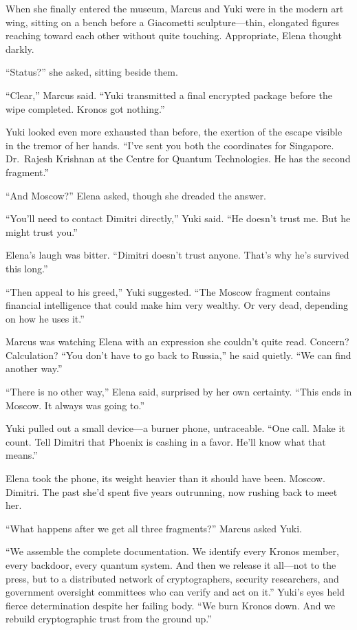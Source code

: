When she finally entered the museum, Marcus and Yuki were in the modern art wing, sitting on a bench before a Giacometti sculpture---thin, elongated figures reaching toward each other without quite touching. Appropriate, Elena thought darkly.

``Status?'' she asked, sitting beside them.

``Clear,'' Marcus said. ``Yuki transmitted a final encrypted package before the wipe completed. Kronos got nothing.''

Yuki looked even more exhausted than before, the exertion of the escape visible in the tremor of her hands. ``I've sent you both the coordinates for Singapore. Dr.~Rajesh Krishnan at the Centre for Quantum Technologies. He has the second fragment.''

``And Moscow?'' Elena asked, though she dreaded the answer.

``You'll need to contact Dimitri directly,'' Yuki said. ``He doesn't trust me. But he might trust you.''

Elena's laugh was bitter. ``Dimitri doesn't trust anyone. That's why he's survived this long.''

``Then appeal to his greed,'' Yuki suggested. ``The Moscow fragment contains financial intelligence that could make him very wealthy. Or very dead, depending on how he uses it.''

Marcus was watching Elena with an expression she couldn't quite read. Concern? Calculation? ``You don't have to go back to Russia,'' he said quietly. ``We can find another way.''

``There is no other way,'' Elena said, surprised by her own certainty. ``This ends in Moscow. It always was going to.''

Yuki pulled out a small device---a burner phone, untraceable. ``One call. Make it count. Tell Dimitri that Phoenix is cashing in a favor. He'll know what that means.''

Elena took the phone, its weight heavier than it should have been. Moscow. Dimitri. The past she'd spent five years outrunning, now rushing back to meet her.

``What happens after we get all three fragments?'' Marcus asked Yuki.

``We assemble the complete documentation. We identify every Kronos member, every backdoor, every quantum system. And then we release it all---not to the press, but to a distributed network of cryptographers, security researchers, and government oversight committees who can verify and act on it.'' Yuki's eyes held fierce determination despite her failing body. ``We burn Kronos down. And we rebuild cryptographic trust from the ground up.''


